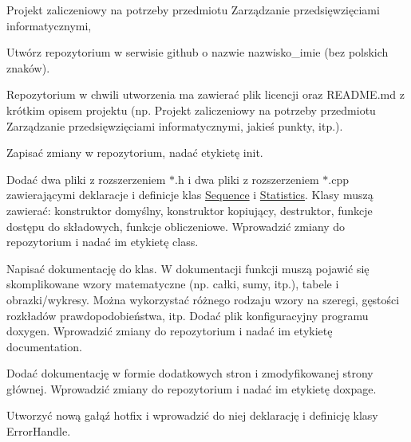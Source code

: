 Projekt zaliczeniowy na potrzeby przedmiotu Zarządzanie przedsięwzięciami informatycznymi,
\begin{DoxyEnumerate}
\item Utwórz repozytorium w serwisie github o nazwie \textquotesingle{}nazwisko\+\_\+imie\textquotesingle{} (bez polskich znaków).
\item Repozytorium w chwili utworzenia ma zawierać plik licencji oraz README.\+md z krótkim opisem projektu (np. Projekt zaliczeniowy na potrzeby przedmiotu Zarządzanie przedsięwzięciami informatycznymi, jakieś punkty, itp.).
\item Zapisać zmiany w repozytorium, nadać etykietę \textquotesingle{}init\textquotesingle{}.
\item Dodać dwa pliki z rozszerzeniem $\ast$.h i dwa pliki z rozszerzeniem $\ast$.cpp zawierającymi deklaracje i definicje klas \textquotesingle{}\mbox{\hyperlink{class_sequence}{Sequence}}\textquotesingle{} i \textquotesingle{}\mbox{\hyperlink{class_statistics}{Statistics}}\textquotesingle{}. Klasy muszą zawierać\+: konstruktor domyślny, konstruktor kopiujący, destruktor, funkcje dostępu do składowych, funkcje obliczeniowe. Wprowadzić zmiany do repozytorium i nadać im etykietę \textquotesingle{}class\textquotesingle{}.
\item Napisać dokumentację do klas. W dokumentacji funkcji muszą pojawić się skomplikowane wzory matematyczne (np. całki, sumy, itp.), tabele i obrazki/wykresy. Można wykorzystać różnego rodzaju wzory na szeregi, gęstości rozkładów prawdopodobieństwa, itp. Dodać plik konfiguracyjny programu doxygen. Wprowadzić zmiany do repozytorium i nadać im etykietę \textquotesingle{}documentation\textquotesingle{}.
\item Dodać dokumentację w formie dodatkowych stron i zmodyfikowanej strony głównej. Wprowadzić zmiany do repozytorium i nadać im etykietę \textquotesingle{}doxpage\textquotesingle{}.
\item Utworzyć nową gałąź \textquotesingle{}hotfix\textquotesingle{} i wprowadzić do niej deklarację i definicję klasy \textquotesingle{}Error\+Handle\textquotesingle{}. 
\end{DoxyEnumerate}